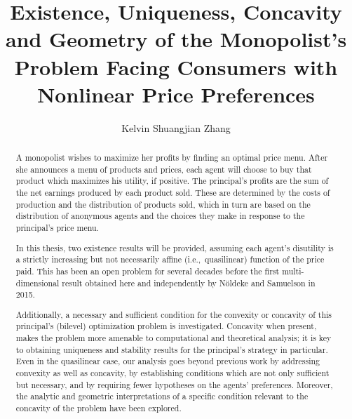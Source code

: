 \documentclass{ut-thesis}[10pt]
\author{Kelvin Shuangjian Zhang}
\title{Existence, Uniqueness, Concavity and Geometry of the Monopolist's Problem Facing Consumers with Nonlinear Price Preferences}
\theoremstyle{plain}
\theoremstyle{definition}
\theoremstyle{remark}
\numberwithin{equation}{section}
\begin{document}
\begin{preliminary}

\maketitle

\cleardoublepage

\begin{abstract}

	A monopolist wishes to maximize her profits by finding an optimal price menu. After she announces a menu of products and prices, each agent will choose to buy that product which maximizes his utility, if positive. 
	The principal's profits are the sum of the net earnings produced by each product sold.  
	These are determined by the costs of production and the distribution of products sold, which in turn are based on the distribution of anonymous agents and
	the choices they make in response to the principal's price menu. \medskip 
	
	In this thesis, two existence results will be provided, assuming each agent's disutility is a strictly increasing but not necessarily affine (i.e.,\ quasilinear) function of the price paid. This has been an open problem for several decades before the first multi-dimensional result obtained here and independently by N\"oldeke and Samuelson in 2015.\medskip
	

	Additionally, a necessary and sufficient condition for the convexity or concavity of this principal's (bilevel) optimization problem is investigated. 
	Concavity when present, makes the problem more amenable to 
	computational and theoretical analysis;  it is key to obtaining uniqueness and stability results for the principal's strategy in particular.  Even in the quasilinear case, our analysis goes beyond previous work by addressing convexity as well as concavity,  by establishing conditions which are not only sufficient but necessary,  and by requiring fewer hypotheses on the agents' preferences.	Moreover, the analytic and geometric interpretations of a specific condition relevant to the concavity of the problem have been explored.\medskip
	

\end{abstract}
\end{preliminary}
\end{document}
